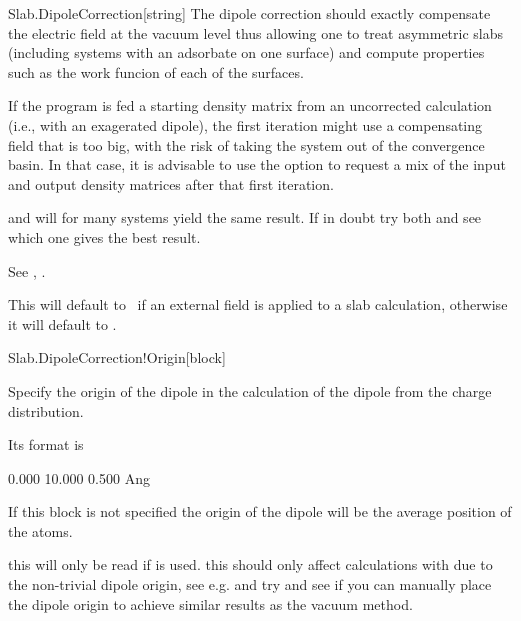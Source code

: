 \begin{fdfentry}{Slab.DipoleCorrection}[string]
  The dipole correction should exactly compensate the electric field
  at the vacuum level thus allowing one to treat asymmetric slabs
  (including systems with an adsorbate on one surface) and compute
  properties such as the work funcion of each of the surfaces.

  \note If the program is fed a starting density matrix from an
  uncorrected calculation (i.e., with an exagerated dipole), the first
  iteration might use a compensating field that is too big, with the
  risk of taking the system out of the convergence basin. In that
  case, it is advisable to use the  option to request a mix of the input and
  output density matrices after that first iteration.

  \note {} and  will for many systems yield
  the same result. If in doubt try both and see which one gives the
  best result.

  See , .

  This will default to \fdftrue\ if an external field is applied to a
  slab calculation, otherwise it will default to \fdffalse.

\end{fdfentry}

\begin{fdfentry}{Slab.DipoleCorrection!Origin}[block]

  Specify the origin of the dipole in the calculation of the dipole
  from the charge distribution.

  Its format is
  \begin{fdfexample}
        0.000  10.000  0.500  Ang
  \end{fdfexample}

  If this block is not specified the origin of the dipole will be the
  average position of the atoms.

  \note this will only be read if 
  is used.
  \note this should only affect calculations with
   due to the non-trivial dipole origin, see
  e.g.  and try and see if you can
  manually place the dipole origin to achieve similar results as the
  vacuum method.

\end{fdfentry}

